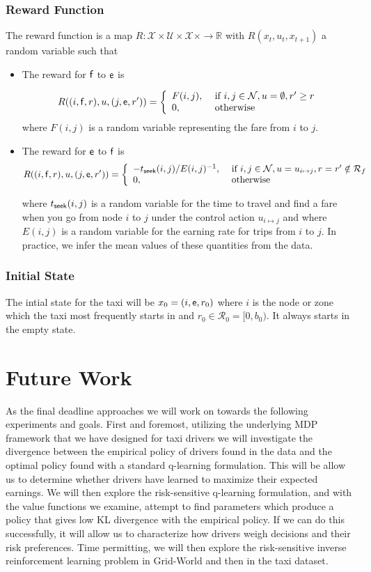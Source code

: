 \documentclass{article}
\newcommand{\mc}{\mathcal}
\newcommand{\mb}{\mathbb}
\newcommand{\rar}{\rightarrow}
\newcommand{\sn}[1]{{\sf{#1}}}
\newcommand{\e}{{\sf e}}
\newcommand{\f}{{\sf f}}
\begin{document}
\subsubsection{Reward Function}
The reward function is a map $R:\mc{X}\times \mc{U}\times \mc{X}\times \rar \mb{R}$ with $R(x_{t},u_t,x_{t+1})$ a random variable such that
\begin{itemize}
\item The reward for $\f$ to $\e$ is 

\[R( (i,\f,r), u, (j,\e,r'))=\left\{\begin{array}{ll}F(i,j), & \ \text{if}\ i,j\in \mc{N}, u=\emptyset, r'\geq r\\ 0, & \ \text{otherwise}\end{array}\right.\]
where $F(i,j)$ is a random variable representing the fare from $i$ to $j$. 


\item The reward for $\e$ to $\f$ is 
\[R((i,\f,r), u, (j,\e,r'))=\left\{\begin{array}{ll}-t_{\text{\sn{seek}}}(i,j)/E(i,j)^{-1}, & \ \text{if}\ i,j\in \mc{N}, u=u_{i\mapsto j}, r=r'\notin \mc{R}_f\\
0, & \ \text{otherwise}\end{array}\right.\]

where $t_{\text{\sn{seek}}}(i,j)$ is a random variable for the time to travel and find a fare when you go from node $i$ to $j$ under the control action $u_{i\mapsto j}$ and where $E(i,j)$ is a random variable for the earning rate for trips from $i$ to $j$. In practice, we infer the mean values of these quantities from the data.
\end{itemize}

\subsubsection{Initial State}
The intial state for the taxi will be $x_0=(i,\e,r_0)$ where $i$ is the node or
zone which the taxi most frequently starts in and $r_0\in \mc{R}_0=[0,b_0)$. It always starts in the empty state.
\section{Future Work}
As the final deadline approaches we will work on towards the following experiments and goals. First and foremost, utilizing the underlying MDP framework that we have designed for taxi drivers we will investigate the divergence between the empirical policy of drivers found in the data and the optimal policy found with a standard q-learning formulation. This will be allow us to determine whether drivers have learned to maximize their expected earnings. We will then explore the risk-sensitive q-learning formulation, and with the value functions we examine, attempt to find parameters which produce a policy that gives low KL divergence with the empirical policy. If we can do this successfully, it will allow us to characterize how drivers weigh decisions and their risk preferences. Time permitting, we will then explore the risk-sensitive inverse reinforcement learning problem in Grid-World and then in the taxi dataset. 
\end{document}
